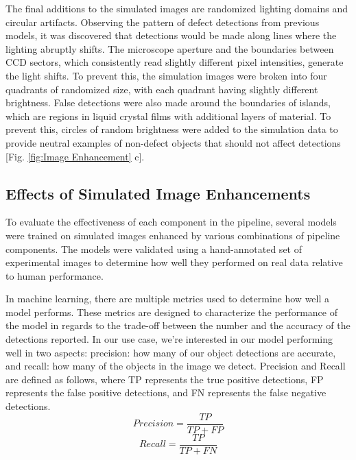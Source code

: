 \documentclass[prl,reprint,showpacs,floatfix,nofootinbib]{revtex4-1}
\begin{document}
The final additions to the simulated images are randomized lighting domains and circular artifacts. Observing the pattern of defect detections from previous models, it was discovered that detections would be made along lines where the lighting abruptly shifts. The microscope aperture and the boundaries between CCD sectors, which consistently read slightly different pixel intensities, generate the light shifts. To prevent this, the simulation images were broken into four quadrants of randomized size, with each quadrant having slightly different brightness. False detections were also made around the boundaries of islands, which are regions in liquid crystal films with additional layers of material. To prevent this, circles of random brightness were added to the simulation data to provide neutral examples \cite{koppel_importance_2006} of non-defect objects that should not affect detections [Fig. \ref{fig:Image Enhancement} c].

\subsection{Effects of Simulated Image Enhancements}

To evaluate the effectiveness of each component in the pipeline, several models were trained on simulated images enhanced by various combinations of pipeline components. The models were validated using a hand-annotated set of experimental images to determine how well they performed on real data relative to human performance.

In machine learning, there are multiple metrics used to determine how well a model performs. These metrics are designed to characterize the performance of the model in regards to the trade-off between the number and the accuracy of the detections reported. In our use case, we're interested in our model performing well in two aspects: precision: how many of our object detections are accurate, and recall: how many of the objects in the image we detect. Precision and Recall are defined as follows, where TP represents the true positive detections, FP represents the false positive detections, and FN represents the false negative detections.
\begin{equation}
Precision = \frac{TP}{TP+FP}
\end{equation}
\begin{equation}
Recall = \frac{TP}{TP+FN}
\end{equation} 
\end{document}
